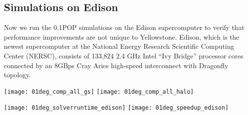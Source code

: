\subsection{Simulations on Edison}
Now we run the 0.1\degree\space POP simulations on the Edison supercomputer
to verify that performance improvements are not unique to Yellowstone.
Edison, which is the newest supercomputer at the National Energy
Research Scientific Computing Center (NERSC), consists of 133,824 2.4
GHz Intel ``Ivy Bridge'' processor cores connected by an 8GBps Cray
Aries high-speed interconnect with Dragonfly topology.
\begin {figure*}[t!]
\begin{center}
\texttt{[image: 01deg\_comp\_all\_gs]}
\hspace{10pt}
\texttt{[image: 01deg\_comp\_all\_halo]}
\end{center}
\vspace{-.2in}
\caption[] {Execution times for the major components of the
  barotropic solvers in 0.1\degree\space POP on Yellowstone:  global
  reduction (left) and boundary communication (right). }
\label{fig:component}
\end {figure*}
\begin {figure*}[t!]
\begin{center}
\texttt{[image: 01deg\_solverruntime\_edison]}
\hspace{10pt}
\texttt{[image: 01deg\_speedup\_edison]}
\end{center}
\vspace{-.2in}
\caption []{Execution times for the barotropic mode in  0.1\degree\space POP
  for one simulation day on Edison (left). 
The core simulation rate of 0.1\degree\space POP on Edison (right).\label {fig:runtime01_edison}}
\vspace{-.2in}
\end {figure*}

